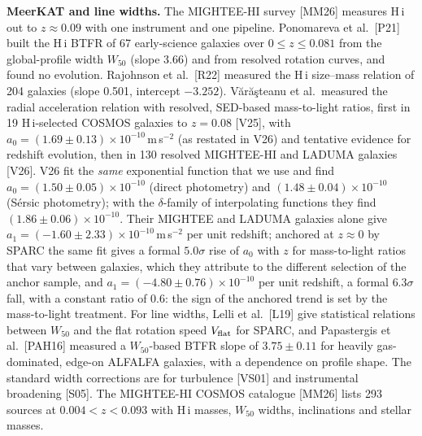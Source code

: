 \documentclass[10pt]{article}
\begin{document}
\textbf{MeerKAT and line widths.} The MIGHTEE-HI survey [MM26] measures H\,{\sc i} out to $z\approx0.09$ with one instrument and one pipeline. Ponomareva et al.\ [P21] built the H\,{\sc i} BTFR of 67 early-science galaxies over $0\le z\le0.081$ from the global-profile width $W_{50}$ (slope 3.66) and from resolved rotation curves, and found no evolution. Rajohnson et al.\ [R22] measured the H\,{\sc i} size--mass relation of 204 galaxies (slope 0.501, intercept $-3.252$). V\u{a}r\u{a}\c{s}teanu et al.\ measured the radial acceleration relation with resolved, SED-based mass-to-light ratios, first in 19 H\,{\sc i}-selected COSMOS galaxies to $z=0.08$ [V25], with $a_0=(1.69\pm0.13)\times10^{-10}$\,m\,s$^{-2}$ (as restated in V26) and tentative evidence for redshift evolution, then in 130 resolved MIGHTEE-HI and LADUMA galaxies [V26]. V26 fit the \emph{same} exponential function that we use and find $a_0=(1.50\pm0.05)\times10^{-10}$ (direct photometry) and $(1.48\pm0.04)\times10^{-10}$ (S\'ersic photometry); with the $\delta$-family of interpolating functions they find $(1.86\pm0.06)\times10^{-10}$. Their MIGHTEE and LADUMA galaxies alone give $a_1=(-1.60\pm2.33)\times10^{-10}$\,m\,s$^{-2}$ per unit redshift; anchored at $z\approx0$ by SPARC the same fit gives a formal $5.0\sigma$ rise of $a_0$ with $z$ for mass-to-light ratios that vary between galaxies, which they attribute to the different selection of the anchor sample, and $a_1=(-4.80\pm0.76)\times10^{-10}$ per unit redshift, a formal $6.3\sigma$ fall, with a constant ratio of 0.6: the sign of the anchored trend is set by the mass-to-light treatment. For line widths, Lelli et al.\ [L19] give statistical relations between $W_{50}$ and the flat rotation speed $V_{\rm flat}$ for SPARC, and Papastergis et al.\ [PAH16] measured a $W_{50}$-based BTFR slope of $3.75\pm0.11$ for heavily gas-dominated, edge-on ALFALFA galaxies, with a dependence on profile shape. The standard width corrections are for turbulence [VS01] and instrumental broadening [S05]. The MIGHTEE-HI COSMOS catalogue [MM26] lists 293 sources at $0.004<z<0.093$ with H\,{\sc i} masses, $W_{50}$ widths, inclinations and stellar masses.
\end{document}
